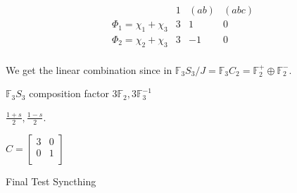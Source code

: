 \documentclass{article}
\theoremstyle{definition}
\begin{document}
\[
    \begin{array}{cccc}
         & 1 & (ab) & (abc)\\
    \Phi_1=\chi_1 + \chi_3 & 3 & 1 & 0 \\
    \Phi_2=\chi_2 + \chi_3 & 3 & -1 & 0 \\
    
    \end{array}
\]

We get the linear combination since in \(\mathbb{F}_3 S_3 / J =\mathbb{F} _3 C_2 = \mathbb{F}_2^+ \oplus \mathbb{F}_2^-\).


\(\mathbb{F}_3 S_3\) composition factor \(3 \mathbb{F}_2, 3 \mathbb{F}_3^{-1}\)

\(\frac{1+s}{2}, \frac{1-s}{2}\).

\(C = \begin{bmatrix}
    3 & 0\\
    0 & 1\\
\end{bmatrix}\) 

Final Test Syncthing
\end{document}
